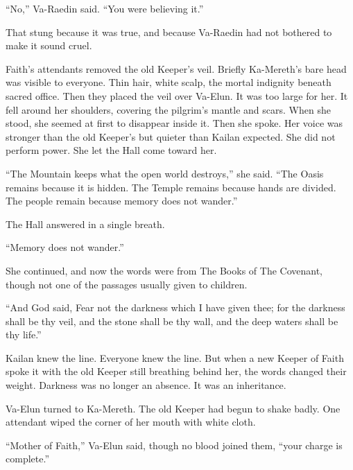 “No,” Va-Raedin said. “You were believing it.”\par

That stung because it was true, and because Va-Raedin had not bothered to make it sound cruel.\par

Faith’s attendants removed the old Keeper’s veil. Briefly Ka-Mereth’s bare head was visible to everyone. Thin hair, white scalp, the mortal indignity beneath sacred office. Then they placed the veil over Va-Elun. It was too large for her. It fell around her shoulders, covering the pilgrim’s mantle and scars. When she stood, she seemed at first to disappear inside it. Then she spoke. Her voice was stronger than the old Keeper’s but quieter than Kailan expected. She did not perform power. She let the Hall come toward her.\par

“The Mountain keeps what the open world destroys,” she said. “The Oasis remains because it is hidden. The Temple remains because hands are divided. The people remain because memory does not wander.”\par

The Hall answered in a single breath.\par

“Memory does not wander.”\par

She continued, and now the words were from The Books of The Covenant, though not one of the passages usually given to children.\par

\begin{scripture}
“And God said, Fear not the darkness which I have given thee; for the darkness shall be thy veil, and the stone shall be thy wall, and the deep waters shall be thy life.”
\end{scripture}

Kailan knew the line. Everyone knew the line. But when a new Keeper of Faith spoke it with the old Keeper still breathing behind her, the words changed their weight. Darkness was no longer an absence. It was an inheritance.\par

Va-Elun turned to Ka-Mereth. The old Keeper had begun to shake badly. One attendant wiped the corner of her mouth with white cloth.\par

“Mother of Faith,” Va-Elun said, though no blood joined them, “your charge is complete.”\par

